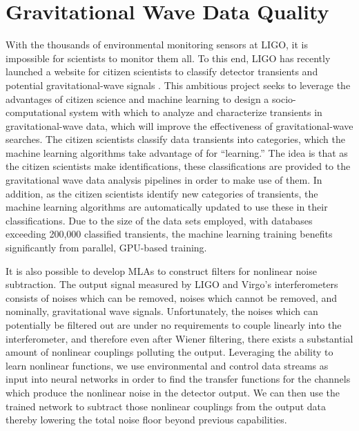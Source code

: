 \documentclass[letterpaper, aps, prd, superscriptaddress, showpacs, nofootinbib]{revtex4}
\begin{document}
\section{Gravitational Wave Data Quality}
\label{sec:gw_data}

With the thousands of environmental monitoring sensors at LIGO, it is impossible for scientists to monitor them all. To this end, LIGO has recently launched a website for citizen scientists to classify detector transients and potential gravitational-wave signals \cite{gravityspy}. This ambitious project seeks to leverage the advantages of citizen science and machine learning to design a socio-computational system with which to analyze and characterize transients in gravitational-wave data, which will improve the effectiveness of gravitational-wave searches. The citizen scientists classify data transients into categories, which the machine learning algorithms take advantage of for ``learning.'' The idea is that as the citizen scientists make identifications, these classifications are provided to the gravitational wave data analysis pipelines in order to make use of them. In addition, as the citizen scientists identify new categories of transients, the machine learning algorithms are automatically updated to use these in their classifications. Due to the size of the data sets employed, with databases exceeding 200,000 classified transients, the machine learning training benefits significantly from parallel, GPU-based training.

It is also possible to develop MLAs to construct filters for nonlinear noise subtraction. The output signal measured by LIGO and Virgo's interferometers consists of noises which can be removed, noises which cannot be removed, and nominally, gravitational wave signals. Unfortunately, the noises which can potentially be filtered out are under no requirements to couple linearly into the interferometer, and therefore even after Wiener filtering, there exists a substantial amount of nonlinear couplings polluting the output. Leveraging the ability to learn nonlinear functions, we use environmental and control data streams as input into neural networks in order to find the transfer functions for the channels which produce the nonlinear noise in the detector output. We can then use the trained network to subtract those nonlinear couplings from the output data thereby lowering the total noise floor beyond previous capabilities.
\end{document}
